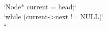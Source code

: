 \documentclass[preview]{standalone}
\begin{document}
`Node* current = head;`\\`while (current->next != NULL)`\\``\\
\end{document}
